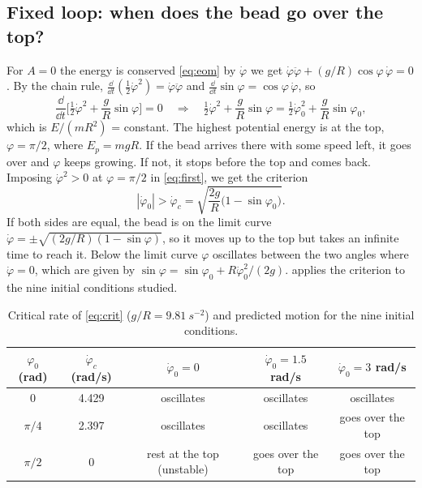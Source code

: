 \documentclass[11pt,a4paper]{article}
\newcommand{\dt}[1]{\dot{#1}}
\newcommand{\ddt}[1]{\ddot{#1}}
\begin{document}
\subsection{Fixed loop: when does the bead go over the top?}\label{sec:crit}
For $A=0$ the energy is conserved \cref{eq:eom} by $\dt\varphi$ we get $\dt\varphi\ddt\varphi+(g/R)\cos\varphi\,\dt\varphi=0$. By the chain rule, $\frac{\dd}{\dd t}(\tfrac12\dt\varphi^2)=\dt\varphi\ddt\varphi$ and $\frac{\dd}{\dd t}\sin\varphi=\cos\varphi\,\dt\varphi$, so
\begin{equation}
\frac{\dd}{\dd t}\Big[\tfrac12\dt\varphi^2+\frac gR\sin\varphi\Big]=0\quad\Rightarrow\quad \tfrac12\dt\varphi^2+\frac gR\sin\varphi=\tfrac12\dt\varphi_0^2+\frac gR\sin\varphi_0 ,
\label{eq:first}
\end{equation}
which is $E/(mR^2)$ = constant. The highest potential energy is at the top, $\varphi=\pi/2$, where $E_p=mgR$. If the bead arrives there with some speed left, it goes over and $\varphi$ keeps growing. If not, it stops before the top and comes back. Imposing $\dt\varphi^2>0$ at $\varphi=\pi/2$ in \cref{eq:first}, we get the criterion
\begin{equation}
|\dt\varphi_0|>\dt\varphi_c=\sqrt{\frac{2g}{R}\big(1-\sin\varphi_0\big)} .
\label{eq:crit}
\end{equation}
If both sides are equal, the bead is on the limit curve $\dt\varphi=\pm\sqrt{(2g/R)(1-\sin\varphi)}$, so it moves up to the top but takes an infinite time to reach it. Below the limit curve $\varphi$ oscillates between the two angles where $\dt\varphi=0$, which are given by $\sin\varphi=\sin\varphi_0+R\dt\varphi_0^2/(2g)$.  applies the criterion to the nine initial conditions studied.
\begin{table}[htbp]
\centering\small
\caption{Critical rate of \cref{eq:crit} ($g/R=\SI{9.81}{s^{-2}}$) and predicted motion for the nine initial conditions.}\label{tab:crit}
\begin{tabular}{ccccc}
\toprule
$\varphi_0$ (rad) & $\dt\varphi_c$ (rad/s) & $\dt\varphi_0=0$ & $\dt\varphi_0=1.5$ rad/s & $\dt\varphi_0=3$ rad/s\\
\midrule
$0$ & 4.429 & oscillates & oscillates & oscillates\\
$\pi/4$ & 2.397 & oscillates & oscillates & goes over the top\\
$\pi/2$ & 0 & rest at the top (unstable) & goes over the top & goes over the top\\
\bottomrule
\end{tabular}
\end{table}
\end{document}
